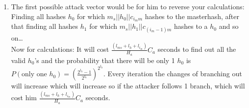 \documentclass[11pt]{article}
\begin{document}
\begin{enumerate}
\item The first possible attack vector would be for him to reverse your calculations:\\Finding all hashes $h_0$ for which $m_s||h_0||c_{{i_m}m}$ hashes to the masterhash, after that finding all hashes $h_1$ for which $m_s||h_1||c_{({i_m-1})m}$ hashes to a $h_0$ and so on\ldots\\Now for calculations: It will cost $\frac{(l_{ms}+l_h+l_{i_m})}{H_a}C_a$ seconds to find out all the valid $h_0$'s and the probability that there will be only 1 $h_0$ is $P(\textrm{only one }h_0)=(\frac{2^{l_h}-1}{2^{l_h}})^{2^{l_h}}$. Every iteration the changes of branching out will increase which will increase so if the attacker follows 1 branch, which will cost him $\frac{(l_{ms}+l_h+l_{i_m})}{H_a}C_a$ seconds.



\end{enumerate}
\end{document}
